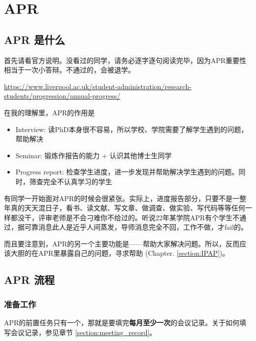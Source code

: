 \section{APR}
\subsection{APR 是什么}
首先请看官方说明。没看过的同学，请务必逐字逐句阅读完毕，因为APR重要性相当于一次小答辩。不通过的，会被退学。

\url{https://www.liverpool.ac.uk/student-administration/research-students/progression/annual-progress/}

在我的理解里，APR的作用是
\begin{itemize}
    \item Interview: 读PhD本身很不容易，所以学校、学院需要了解学生遇到的问题，帮助解决
    \item Seminar: 锻炼作报告的能力 + 认识其他博士生同学
    \item Progress report: 检查学生进度，进一步发现并帮助解决学生遇到的问题。同时，筛查完全不认真学习的学生
\end{itemize}

有同学一开始面对APR的时候会很紧张。实际上，进度报告部分，只要不是一整年真的天天混日子，看书、读文献、写文章、做调查、做实验、写代码等等任何一样都没干，评审老师是不会刁难你不给过的。听说22年某学院APR有个学生不通过，据可靠消息此人是近乎人间蒸发，导师消息完全不回，工作不做，才fail的。

而且要注意到，APR的另一个主要功能是——帮助大家解决问题。所以，反而应该大胆的在APR里暴露自己的问题，寻求帮助 (Chapter. \ref{section:IPAP})。

\subsection{APR 流程}
\subsubsection{准备工作}
APR的前置任务只有一个，那就是要填完\textbf{每月至少一次}的会议记录。关于如何填写会议记录，参见章节 \ref{section:meeting_record}。

